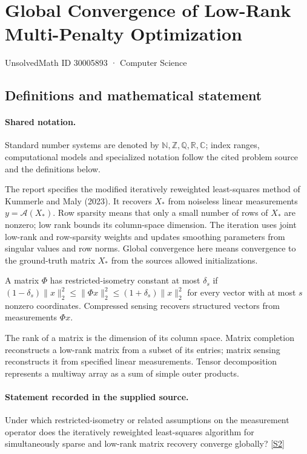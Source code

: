 \documentclass[11pt]{article}
\newcommand{\sref}[2]{\hyperlink{source:#1:#2}{[S#2]}}
\begin{document}
\setcounter{section}{30005892}
\section{Global Convergence of Low-Rank Multi-Penalty Optimization}\label{30005893}
{\small\sffamily UnsolvedMath ID 30005893 · Computer Science}
\subsection{Definitions and mathematical statement}

\paragraph{Shared notation.}Standard number systems are denoted by $\mathbb N,\mathbb Z,\mathbb Q,\mathbb R,\mathbb C$; index ranges, computational models and specialized notation follow the cited problem source and the definitions below.


The report specifies the modified iteratively reweighted least-squares method of Kummerle and Maly (2023). It recovers $X_*$ from noiseless linear measurements $y=\mathcal A(X_*)$. Row sparsity means that only a small number of rows of $X_*$ are nonzero; low rank bounds its column-space dimension. The iteration uses joint low-rank and row-sparsity weights and updates smoothing parameters from singular values and row norms. Global convergence here means convergence to the ground-truth matrix $X_*$ from the source\textquotesingle s allowed initializations.

A matrix $\Phi$ has restricted-isometry constant at most $\delta_s$ if $(1-\delta_s)\lVert x\rVert_2^2\leq\lVert\Phi x\rVert_2^2\leq(1+\delta_s)\lVert x\rVert_2^2$ for every vector with at most $s$ nonzero coordinates. Compressed sensing recovers structured vectors from measurements $\Phi x$.

The rank of a matrix is the dimension of its column space. Matrix completion reconstructs a low-rank matrix from a subset of its entries; matrix sensing reconstructs it from specified linear measurements. Tensor decomposition represents a multiway array as a sum of simple outer products.
\paragraph{Statement recorded in the supplied source.}
Under which restricted-isometry or related assumptions on the measurement operator does the iteratively reweighted least-squares algorithm for simultaneously sparse and low-rank matrix recovery converge globally? \sref{30005893}{2}
\end{document}
